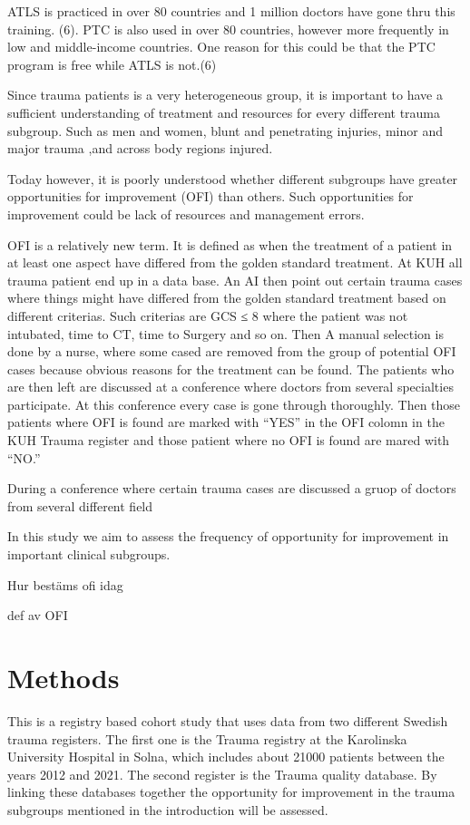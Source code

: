 \documentclass[
]{article}
\begin{document}
ATLS is practiced in over 80 countries and 1 million doctors have gone
thru this training. (6). PTC is also used in over 80 countries, however
more frequently in low and middle-income countries. One reason for this
could be that the PTC program is free while ATLS is not.(6)

Since trauma patients is a very heterogeneous group, it is important to
have a sufficient understanding of treatment and resources for every
different trauma subgroup. Such as men and women, blunt and penetrating
injuries, minor and major trauma ,and across body regions injured.

Today however, it is poorly understood whether different subgroups have
greater opportunities for improvement (OFI) than others. Such
opportunities for improvement could be lack of resources and management
errors.

OFI is a relatively new term. It is defined as when the treatment of a
patient in at least one aspect have differed from the golden standard
treatment. At KUH all trauma patient end up in a data base. An AI then
point out certain trauma cases where things might have differed from the
golden standard treatment based on different criterias. Such criterias
are GCS ≤ 8 where the patient was not intubated, time to CT, time to
Surgery and so on. Then A manual selection is done by a nurse, where
some cased are removed from the group of potential OFI cases because
obvious reasons for the treatment can be found. The patients who are
then left are discussed at a conference where doctors from several
specialties participate. At this conference every case is gone through
thoroughly. Then those patients where OFI is found are marked with
``YES'' in the OFI colomn in the KUH Trauma register and those patient
where no OFI is found are mared with ``NO.''

During a conference where certain trauma cases are discussed a gruop of
doctors from several different field

In this study we aim to assess the frequency of opportunity for
improvement in important clinical subgroups.

Hur bestäms ofi idag

def av OFI

\hypertarget{methods-1}{%
\section{Methods}\label{methods-1}}

This is a registry based cohort study that uses data from two different
Swedish trauma registers. The first one is the Trauma registry at the
Karolinska University Hospital in Solna, which includes about 21000
patients between the years 2012 and 2021. The second register is the
Trauma quality database. By linking these databases together the
opportunity for improvement in the trauma subgroups mentioned in the
introduction will be assessed.
\end{document}
